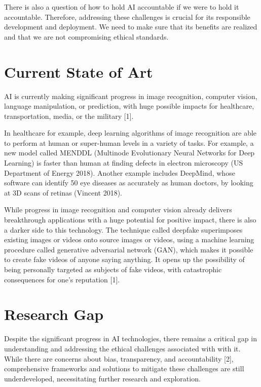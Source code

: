 \documentclass[journal]{IEEEtai}
\begin{document}
There is also a question of how to hold AI accountable if we were to hold it accountable. Therefore, addressing these challenges is crucial for its responsible development and deployment. We need to make sure that its benefits are realized and that we are not compromising ethical standards.

\section{Current State of Art}

AI is currently making significant progress in image
recognition, computer vision, language manipulation, or prediction, with huge possible impacts for healthcare, transportation, media, or the military [1].

In healthcare for example, deep learning algorithms of image recognition are able to perform at human or super-human levels in a variety of tasks. For example, a new model called MENDDL (Multinode Evolutionary Neural Networks for Deep Learning) is faster than human at finding defects in electron microscopy (US Department of Energy 2018). Another example includes DeepMind,
whose software can identify 50 eye diseases as accurately as human doctors, by looking at 3D scans of retinas (Vincent 2018).

While progress in image recognition and computer vision already delivers breakthrough applications with a huge potential for positive impact, there is
also a darker side to this technology. The technique called
deepfake superimposes existing images or videos onto source images or videos, using a machine learning procedure called generative adversarial
network (GAN), which makes it possible to
create fake videos of anyone saying anything. It opens up the possibility of being personally targeted
as subjects of fake videos, with catastrophic consequences for one’s reputation [1].

\section{Research Gap}

Despite the significant progress in AI technologies, there remains a critical gap in understanding and addressing the ethical challenges associated with with it. While there are concerns about bias, transparency, and accountability [2], comprehensive frameworks and solutions to mitigate these challenges are still underdeveloped, necessitating further research and exploration.
\end{document}
